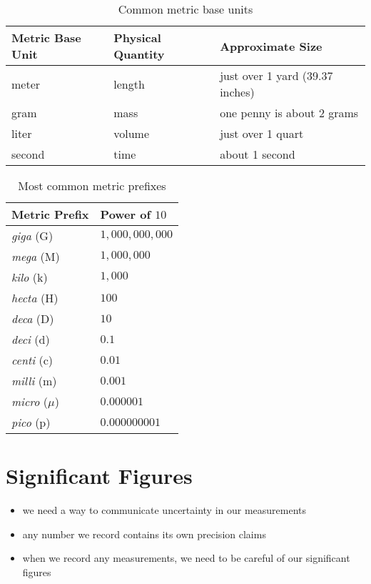 \documentclass[11pt, oneside]{article}   	%
\begin{document}
\begin{table}[p]
\centering
\begin{tabular}[b]{l | l| l}
\hline
Metric Base Unit & Physical Quantity & Approximate Size \\
\hline
meter                  & length                   & just over 1 yard (39.37 inches) \\
gram                   & mass                    & one penny is about 2 grams \\
liter                      & volume                 & just over 1 quart \\
second                & time                      & about 1 second \\
\end{tabular}
\caption{Common metric base units}
\label{table:mbaseunits}
\end{table}


\begin{table}[p]
\centering
\begin{tabular}[b]{l|l}
\hline
Metric Prefix & Power of $10$ \\
\hline
\emph{giga} (G)           & $ 1,000,000,000 $   \\
\emph{mega} (M)         & $ 1,000,000 $   \\
\emph{kilo} (k)              & $ 1,000 $   \\
\emph{hecta} (H)          & $ 100 $   \\
\emph{deca} (D)           & $ 10 $   \\
\emph{deci} (d)             & $ 0.1 $   \\
\emph{centi} (c)            & $ 0.01 $   \\
\emph{milli}  (m)           & $ 0.001 $  \\
\emph{micro} ($\mu$)  & $ 0.000001 $  \\
\emph{pico}  (p)           & $ 0.000000001 $  \\
\end{tabular}
\caption{Most common metric prefixes}
\label{table:mprefixes}
\end{table}


\section{Significant Figures}
\begin{itemize}
\item we need a way to communicate uncertainty in our measurements
\item any number we record contains its own precision claims
\item when we record any measurements, we need to be careful of our significant figures
\end{itemize}
\end{document}
